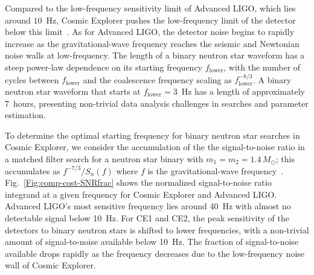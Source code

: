 Compared to the low-frequency sensitivity limit of Advanced LIGO, which lies around $10$~Hz, Cosmic Explorer pushes the low-frequency limit of the detector below this limit~\cite{Reitze:2019iox}. As for Advanced LIGO, the detector noise begins to rapidly increase as the gravitational-wave frequency reaches the seismic and Newtonian noise walls at low-frequency. The length of a binary neutron star waveform has a steep power-law dependence on its starting frequency $f_\mathrm{lower}$, with the number of cycles between $f_\mathrm{lower}$ and the coalescence frequency scaling as $f_\mathrm{lower}^{-8/3}$. A binary neutron star waveform that starts at $f_\mathrm{lower} = 3$~Hz has a length of approximately $7$~hours, presenting non-trivial data analysis challenges in searches and parameter estimation. 

To determine the optimal starting frequency for binary neutron star searches in Cosmic Explorer, we consider the accumulation of the the signal-to-noise ratio in a matched filter search for a neutron star binary with $m_1 = m_2 = 1.4\,M_\odot$; this accumulates as $f^{-7/3} / S_n(f)$ where $f$ is the gravitational-wave frequency~\cite{Finn:2000hj,Allen:2005fk}. Fig.~\ref{Fig:comp-cost-SNRfrac} shows the normalized signal-to-noise ratio integrand at a given frequency for Cosmic Explorer and Advanced LIGO. Advanced LIGO's most sensitive frequency lies around 40~Hz with almost no detectable signal below 10~Hz. For CE1 and CE2, the peak sensitivity of the detectors to binary neutron stars is shifted to lower frequencies, with a non-trivial amount of signal-to-noise available below 10~Hz.
The fraction of signal-to-noise available drops rapidly as the frequency decreases due to the low-frequency noise wall of Cosmic Explorer.

